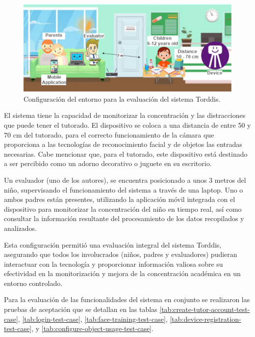 \documentclass[a4paper,fleqn]{cas-sc}
\begin{document}
				\begin{figure}[h]
					\centering
					\includegraphics[width=\linewidth]{figs/Figure_10}
					\caption{Configuración del entorno para la evaluación del sistema Torddis. \label{fig:ConfigEvaluation}} 
				\end{figure}
				
				El sistema tiene la capacidad de monitorizar la concentración y las distracciones que puede tener el tutorado. El dispositivo se coloca a una distancia de entre 50 y 70 cm del tutorado, para el correcto funcionamiento de la cámara que proporciona a las tecnologías de reconocimiento facial y de objetos las entradas necesarias. Cabe mencionar que, para el tutorado, este dispositivo está destinado a ser percibido como un adorno decorativo o juguete en su escritorio.
				
				Un evaluador (uno de los autores), se encuentra posicionado a unos 3 metros del niño, supervisando el funcionamiento del sistema a través de una laptop. Uno o ambos padres están presentes, utilizando la aplicación móvil integrada con el dispositivo para monitorizar la concentración del niño en tiempo real, así como consultar la información resultante del procesamiento de los datos recopilados y analizados.
				
				Esta configuración permitió una evaluación integral del sistema Torddis, asegurando que todos los involucrados (niños, padres y evaluadores) pudieran interactuar con la tecnología y proporcionar información valiosa sobre su efectividad en la monitorización y mejora de la concentración académica en un entorno controlado.
				
				Para la evaluación de las funcionalidades del sistema en conjunto se realizaron las pruebas de aceptación que se detallan en las tablas \ref{tab:create-tutor-account-test-case}, \ref{tab:login-test-case}, \ref{tab:face-training-test-case}, \ref{tab:device-registration-test-case}, y \ref{tab:configure-object-usage-test-case}.
				
\end{document}
